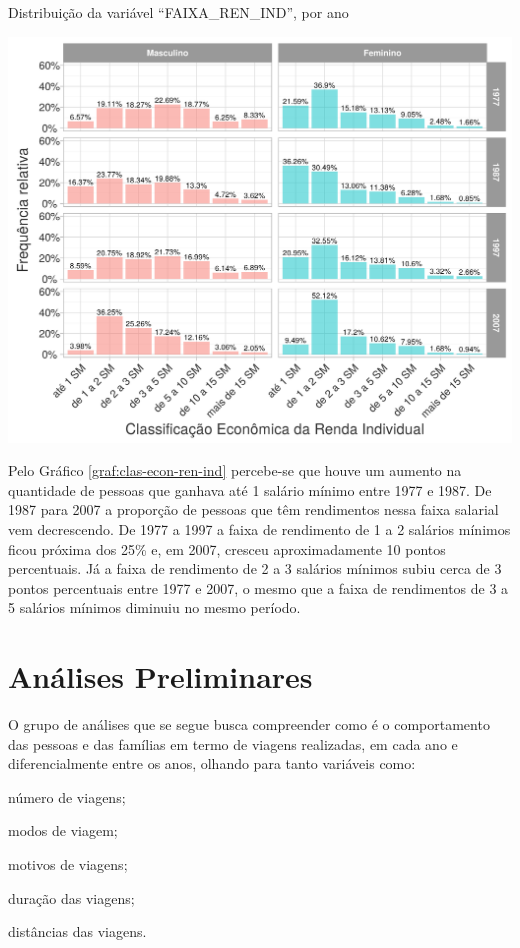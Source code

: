 \begin{grafico}[htb]%
    \caption{\label{graf:clas-econ-ren-ind}Distribuição da variável ``FAIXA_REN_IND'', por ano}%
        \begin{center}%
        \includegraphics[width=1\textwidth]{./imagens/clas-econ-ren-ind.png}%
    \end{center}%
\end{grafico}%

Pelo Gráfico \ref{graf:clas-econ-ren-ind} percebe-se que houve um aumento na quantidade de pessoas que ganhava até 1 salário mínimo entre 1977 e 1987. De 1987 para 2007 a proporção de pessoas que têm rendimentos nessa faixa salarial vem decrescendo. De 1977 a 1997 a faixa de rendimento de 1 a 2 salários mínimos ficou próxima dos 25\% e, em 2007, cresceu aproximadamente 10 pontos percentuais. Já a faixa de rendimento de 2 a 3 salários mínimos subiu cerca de 3 pontos percentuais entre 1977 e 2007, o mesmo que a faixa de rendimentos de 3 a 5 salários mínimos diminuiu no mesmo período.


\clearpage

\section{Análises Preliminares}\label{sec:analises-preliminares}

O grupo de análises que se segue busca compreender como é o comportamento das pessoas e das famílias em termo de viagens realizadas, em cada ano e diferencialmente entre os anos, olhando para tanto variáveis como:
\begin{compactitem}
\item número de viagens;
\item modos de viagem;
\item motivos de viagens;
\item duração das viagens;
\item distâncias das viagens.
\end{compactitem}

